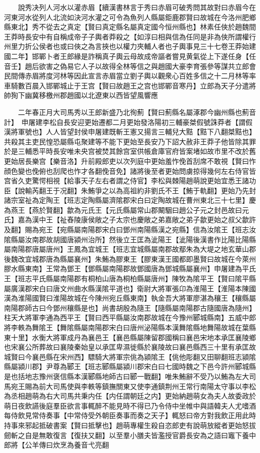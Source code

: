 　　說秀决列人河水以灌赤眉【續漢書林言于秀曰赤眉可破秀問其故對曰赤眉今在河東河水從列人北流如決河水灌之可令為魚列人縣屬鉅鹿郡賢曰故城在今洛州肥鄉縣東北】秀不從去之真定【賢曰真定縣名屬真定國今恒州縣也】林素任俠於趙魏間王莽時長安中有自稱成帝子子輿者莽殺之【如淳曰相與信為任同是非為俠所謂權行州里力折公侯者也或曰俠之為言挾也以權力夾輔人者也子輿事見三十七卷王莽始建國二年】邯鄲卜者王郎緣是詐稱真子輿云母故成帝謳者嘗見黄氣從上下遂任身【任音壬】趙后欲害之偽易它人子以故得全林等信之與趙國大豪李育張參等謀共立郎會民間傳赤眉將度河林等因此宣言赤眉當立劉子輿以觀衆心百姓多信之十二月林等率車騎數百晨入邯鄲城止于王宫【賢曰故趙王之宫也邯鄲音寒丹】立郎為天子分遣將帥狥下幽冀移檄州郡趙國以北遼東以西皆望風響應

　　二年春正月大司馬秀以王郎新盛乃北徇薊【賢曰薊縣名屬涿郡今幽州縣也薊音計】　申屠建李松自長安迎更始遷都二月更始發洛陽初三輔豪桀假號誅莽者【謂假漢將軍號也】人人皆望封侯申屠建既斬王憲又揚言三輔兒大黠【黠下八翻桀黠也】共殺其主吏民惶恐屬縣屯聚建等不能下更始至長安乃下詔大赦非王莽子他皆除其罪於是三輔悉平時長安唯未央宫被焚其餘宫室供帳倉庫官府皆案堵如故市里不改於舊更始居長樂宫【樂音洛】升前殿郎吏以次列庭中更始羞怍俛首刮席不敢視【賢曰怍顔色變也俛俯也刮爬也怍才各翻俛音免】諸將後至者更始問虜掠得幾何左右侍官皆宫省久吏驚愕相視【給事天子左右者謂之侍官】李松與棘陽趙萌說更始宜悉王諸功臣【說輸芮翻王于况翻】朱鮪爭之以為高祖約非劉氏不王【鮪于軌翻】更始乃先封諸宗室祉為定陶王【班志定陶縣屬濟隂郡宋白曰定陶故城在曹州東北三十七里】慶為燕王【燕於賢翻】歙為元氏王【元氏縣屬常山郡闞駰曰趙公子元之封邑故曰元氏】嘉為漢中王【祉舂陵康侯敞之子太宗也慶敞之弟嘉敞之弟子歙更始之叔父歙許及翻】賜為宛王【宛縣屬南陽郡宋白曰鄧州南陽縣漢之宛縣】信為汝隂王【班志汝隂縣屬汝南郡故胡國唐潁州治所】然後立王匡為泚陽王【泚陽後漢書作比陽比陽縣屬南陽郡唐屬唐州】王鳳為宜城王【班志宜城縣屬南郡故鄢朱為大堤之地玄華山郡後魏改宜城郡唐為縣屬襄州】朱鮪為膠東王【膠東漢王國都即墨賢曰故城在今萊州膠水縣東南】王常為鄧王【鄧縣屬南陽郡故鄧國唐為鄧城縣屬襄州】申屠建為平氏王【班志平氏縣屬南陽郡有桐柏山唐為桐柏縣屬唐州】陳牧為隂平王【賢曰隂平縣屬廣漢郡宋白曰唐文州曲水縣漢隂平道也】衛尉大將軍張卬為淮陽王【淮陽本陳國漢為淮陽國賢曰淮陽故城在今陳州宛丘縣東南】執金吾大將軍廖湛為穰王【穰縣屬南陽郡師古曰今鄧州穰縣是也】尚書胡殷為隨王【隨縣屬南陽郡古隨國唐為隨州】柱天大將軍李通為西平王【賢曰西平縣屬汝南郡故城在今豫州郾城縣南】五威中郎將李軼為舞隂王【舞隂縣屬南陽郡宋白曰唐州泌陽縣本漢舞隂縣地舞陽故城在葉縣東十里】水衡大將軍成丹為襄邑王【襄邑縣屬陳留郡國稱曰襄邑宋地本承匡襄陵鄉也宋襄公所葬故曰襄陵秦始皇以承匡卑濕徙縣於襄陵故曰襄邑縣西三十里有承匡故城賢曰今襄邑縣在宋州西】驃騎大將軍宗佻為潁隂王【佻他彫翻又田聊翻班志潁隂縣屬潁川郡】尹尊為郾王【班志郾縣屬潁川郡宋白曰七國時魏之下邑今許州郾城縣是也括地志豫州褒信縣本漢郾縣地師古曰郾一戰翻】唯朱鮪辭不受乃以鮪為左大司馬宛王賜為前大司馬使與李軼等鎮撫關東又使李通鎮荆州王常行南陽太守事以李松為丞相趙萌為右大司馬共秉内任【内任謂朝廷之内】更始納趙萌女為夫人故委政於萌日夜飲讌後庭羣臣欲言事輒醉不能見時不得已乃令侍中坐帷中與語韓夫人尤嗜酒每侍飲見常侍奏事【中常侍受外朝臣奏事而奏之天子】輒怒曰帝方對我飲正用此時持事來邪起抵破書案【賢曰抵擊也】趙萌專權生殺自恣郎吏有說萌放縱者更始怒拔劒斬之自是無敢復言【復扶又翻】以至羣小膳夫皆濫授官爵長安為之語曰竈下養中郎將【公羊傳曰炊烹為養音弋亮翻